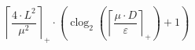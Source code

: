\[\left\lceil \frac{4 \cdot L^{2}}{\mu^{2}} \right\rceil_{+} \cdot \left(\operatorname{clog}_{2}\left(\left\lceil \frac{\mu \cdot D}{\varepsilon} \right\rceil_{+}\right) + 1\right)\]
